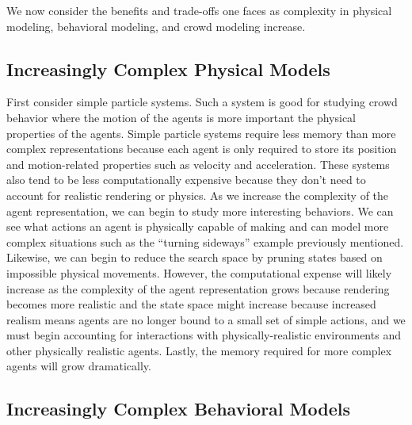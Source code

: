 \documentclass[tog]{acmsiggraph}
\begin{document}



We now consider the benefits and trade-offs one faces as complexity in physical modeling, behavioral modeling, and crowd modeling increase.

\subsection{Increasingly Complex Physical Models}

First consider simple particle systems. Such a system is good for studying crowd behavior where the motion of the agents is more important the physical properties of the agents. Simple particle systems require less memory than more complex representations because each agent is only required to store its position and motion-related properties such as velocity and acceleration. These systems also tend to be less computationally expensive because they don't need to account for realistic rendering or physics. As we increase the complexity of the agent representation, we can begin to study more interesting behaviors. We can see what actions an agent is physically capable of making and can model more complex situations such as the ``turning sideways'' example previously mentioned. Likewise, we can begin to reduce the search space by pruning states based on impossible physical movements. However, the computational expense will likely increase as the complexity of the agent representation grows because rendering becomes more realistic and the state space might increase because increased realism means agents are no longer bound to a small set of simple actions, and we must begin accounting for interactions with physically-realistic environments and other physically realistic agents. Lastly, the memory required for more complex agents will grow dramatically.

\subsection{Increasingly Complex Behavioral Models}
\end{document}
